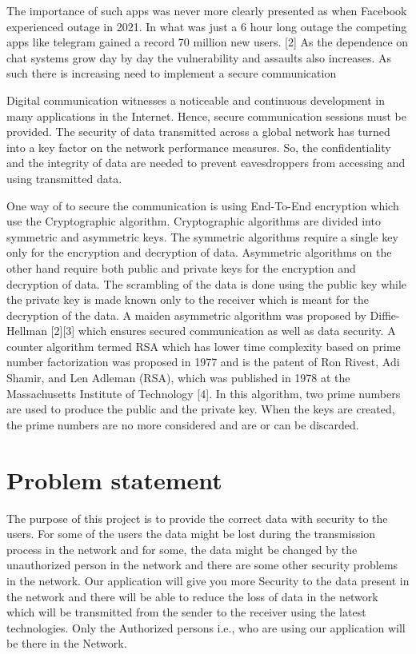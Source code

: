 The importance of such apps was never more clearly presented as when Facebook experienced outage in 2021. In what was just a 6 hour long outage the competing apps like telegram gained a record 70 million new users. [2]
As the dependence on chat systems grow day by day the vulnerability and assaults also increases. As such  there is increasing need to implement a secure communication

Digital communication witnesses a noticeable and continuous development in 
many applications in the Internet. Hence, secure communication sessions must be 
provided. The security of data transmitted across a global network has turned into a 
key factor on the network performance measures. So, the confidentiality and the 
integrity of data are needed to prevent eavesdroppers from accessing and using 
transmitted data.

One way of to secure the communication is using End-To-End encryption which use the Cryptographic algorithm. Cryptographic algorithms are divided 
into symmetric and asymmetric keys. The symmetric algorithms require a single key only for the 
encryption and decryption of data. Asymmetric algorithms on the other hand require both public 
and private keys for the encryption and decryption of data. The scrambling of the data is done 
using the public key while the private key is made known only to the receiver which is meant for 
the decryption of the data. 
A maiden asymmetric algorithm was proposed by Diffie-Hellman [2][3] which ensures secured 
communication as well as data security. A counter algorithm termed RSA which has lower time 
complexity based on prime number factorization was proposed in 1977 and is the patent of Ron 
Rivest, Adi Shamir, and Len Adleman (RSA), which was published in 1978 at the Massachusetts 
Institute of Technology [4]. In this algorithm, two prime numbers are used to produce the public 
and the private key. When the keys are created, the prime numbers are no more considered and 
are or can be discarded. 

  \pagebreak
\section{Problem statement}
\vspace{-18pt}
The purpose of this project is to provide the correct data with security to the users. For 
some of the users the data might be lost during the transmission process in the network 
and for some, the data might be changed by the unauthorized person in the network and 
there are some other security problems in the network. Our application will give you more 
Security to the data present in the network and there will be able to reduce the loss of data 
in the network which will be transmitted from the sender to the receiver using the latest 
technologies. Only the Authorized persons i.e., who are using our application will be 
there in the Network.


